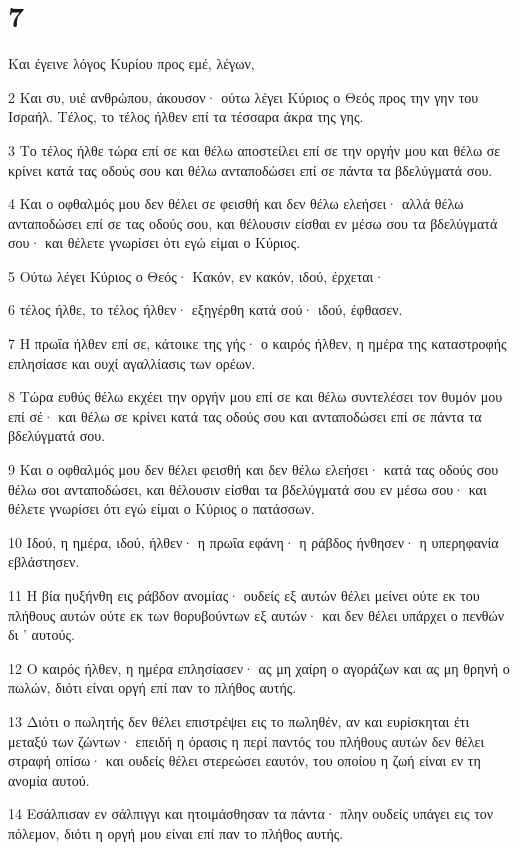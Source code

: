 \chapter{7}

\par Και έγεινε λόγος Κυρίου προς εμέ, λέγων,
\par 2 Και συ, υιέ ανθρώπου, άκουσον· ούτω λέγει Κύριος ο Θεός προς την γην του Ισραήλ. Τέλος, το τέλος ήλθεν επί τα τέσσαρα άκρα της γης.
\par 3 Το τέλος ήλθε τώρα επί σε και θέλω αποστείλει επί σε την οργήν μου και θέλω σε κρίνει κατά τας οδούς σου και θέλω ανταποδώσει επί σε πάντα τα βδελύγματά σου.
\par 4 Και ο οφθαλμός μου δεν θέλει σε φεισθή και δεν θέλω ελεήσει· αλλά θέλω ανταποδώσει επί σε τας οδούς σου, και θέλουσιν είσθαι εν μέσω σου τα βδελύγματά σου· και θέλετε γνωρίσει ότι εγώ είμαι ο Κύριος.
\par 5 Ούτω λέγει Κύριος ο Θεός· Κακόν, εν κακόν, ιδού, έρχεται·
\par 6 τέλος ήλθε, το τέλος ήλθεν· εξηγέρθη κατά σού· ιδού, έφθασεν.
\par 7 Η πρωΐα ήλθεν επί σε, κάτοικε της γής· ο καιρός ήλθεν, η ημέρα της καταστροφής επλησίασε και ουχί αγαλλίασις των ορέων.
\par 8 Τώρα ευθύς θέλω εκχέει την οργήν μου επί σε και θέλω συντελέσει τον θυμόν μου επί σέ· και θέλω σε κρίνει κατά τας οδούς σου και ανταποδώσει επί σε πάντα τα βδελύγματά σου.
\par 9 Και ο οφθαλμός μου δεν θέλει φεισθή και δεν θέλω ελεήσει· κατά τας οδούς σου θέλω σοι ανταποδώσει, και θέλουσιν είσθαι τα βδελύγματά σου εν μέσω σου· και θέλετε γνωρίσει ότι εγώ είμαι ο Κύριος ο πατάσσων.
\par 10 Ιδού, η ημέρα, ιδού, ήλθεν· η πρωΐα εφάνη· η ράβδος ήνθησεν· η υπερηφανία εβλάστησεν.
\par 11 Η βία ηυξήνθη εις ράβδον ανομίας· ουδείς εξ αυτών θέλει μείνει ούτε εκ του πλήθους αυτών ούτε εκ των θορυβούντων εξ αυτών· και δεν θέλει υπάρχει ο πενθών δι ' αυτούς.
\par 12 Ο καιρός ήλθεν, η ημέρα επλησίασεν· ας μη χαίρη ο αγοράζων και ας μη θρηνή ο πωλών, διότι είναι οργή επί παν το πλήθος αυτής.
\par 13 Διότι ο πωλητής δεν θέλει επιστρέψει εις το πωληθέν, αν και ευρίσκηται έτι μεταξύ των ζώντων· επειδή η όρασις η περί παντός του πλήθους αυτών δεν θέλει στραφή οπίσω· και ουδείς θέλει στερεώσει εαυτόν, του οποίου η ζωή είναι εν τη ανομία αυτού.
\par 14 Εσάλπισαν εν σάλπιγγι και ητοιμάσθησαν τα πάντα· πλην ουδείς υπάγει εις τον πόλεμον, διότι η οργή μου είναι επί παν το πλήθος αυτής.
